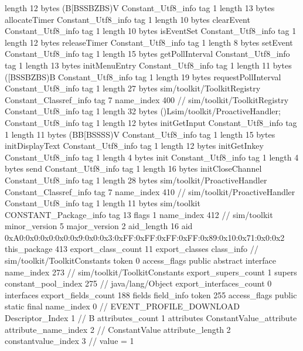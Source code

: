 {{{			length	12
			bytes	(B[BSSBZBS)V
		}
		Constant_Utf8_info {
			tag	1
			length	13
			bytes	allocateTimer
		}
		Constant_Utf8_info {
			tag	1
			length	10
			bytes	clearEvent
		}
		Constant_Utf8_info {
			tag	1
			length	10
			bytes	isEventSet
		}
		Constant_Utf8_info {
			tag	1
			length	12
			bytes	releaseTimer
		}
		Constant_Utf8_info {
			tag	1
			length	8
			bytes	setEvent
		}
		Constant_Utf8_info {
			tag	1
			length	15
			bytes	getPollInterval
		}
		Constant_Utf8_info {
			tag	1
			length	13
			bytes	initMenuEntry
		}
		Constant_Utf8_info {
			tag	1
			length	11
			bytes	([BSSBZBS)B
		}
		Constant_Utf8_info {
			tag	1
			length	19
			bytes	requestPollInterval
		}
		Constant_Utf8_info {
			tag	1
			length	27
			bytes	sim/toolkit/ToolkitRegistry
		}
		Constant_Classref_info {
			tag	7
			name_index	400		// sim/toolkit/ToolkitRegistry
		}
		Constant_Utf8_info {
			tag	1
			length	32
			bytes	()Lsim/toolkit/ProactiveHandler;
		}
		Constant_Utf8_info {
			tag	1
			length	12
			bytes	initGetInput
		}
		Constant_Utf8_info {
			tag	1
			length	11
			bytes	(BB[BSSSS)V
		}
		Constant_Utf8_info {
			tag	1
			length	15
			bytes	initDisplayText
		}
		Constant_Utf8_info {
			tag	1
			length	12
			bytes	initGetInkey
		}
		Constant_Utf8_info {
			tag	1
			length	4
			bytes	init
		}
		Constant_Utf8_info {
			tag	1
			length	4
			bytes	send
		}
		Constant_Utf8_info {
			tag	1
			length	16
			bytes	initCloseChannel
		}
		Constant_Utf8_info {
			tag	1
			length	28
			bytes	sim/toolkit/ProactiveHandler
		}
		Constant_Classref_info {
			tag	7
			name_index	410		// sim/toolkit/ProactiveHandler
		}
		Constant_Utf8_info {
			tag	1
			length	11
			bytes	sim/toolkit
		}
		CONSTANT_Package_info {
			tag	13
			flags	1
			name_index	412		// sim/toolkit
			minor_version	5
			major_version	2
			aid_length	16
			aid	0xA0:0x0:0x0:0x0:0x9:0x0:0x3:0xFF:0xFF:0xFF:0xFF:0x89:0x10:0x71:0x0:0x2
		}
	}
	this_package	413
	export_class_count	11
	export_classes {
		class_info {		// sim/toolkit/ToolkitConstants
			token	0
			access_flags	public abstract interface
			name_index	273		// sim/toolkit/ToolkitConstants
			export_supers_count	1
			supers {
				constant_pool_index	275		// java/lang/Object
			}
			export_interfaces_count	0
			interfaces {
			}
			export_fields_count	188
			fields {
			field_info {
				token	255
				access_flags	public static final
				name_index	0		// EVENT_PROFILE_DOWNLOAD
				Descriptor_Index	1		// B
				attributes_count	1
				attributes {
				ConstantValue_attribute {
					attribute_name_index	2		// ConstantValue
					attribute_length	2
					constantvalue_index	3		// value = 1
}}}}}}}
